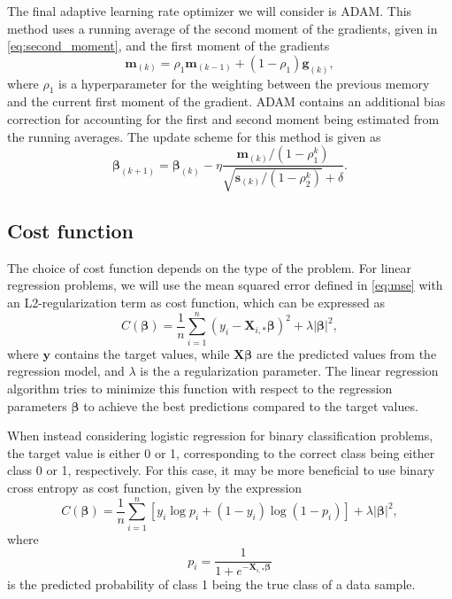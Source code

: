 \documentclass[12pt]{article}
\begin{document}
The final adaptive learning rate optimizer we will consider is ADAM. This method uses a running average of the second moment of the gradients, given in \autoref{eq:second_moment}, and the first moment of the gradients
\begin{equation}
    \boldsymbol{m}_{(k)} =  \rho_1 \boldsymbol{m}_{(k-1)} + (1 - \rho_1) \boldsymbol{g}_{(k)},
\end{equation}
where $\rho_1$ is a hyperparameter for the weighting between the previous memory and the current first moment of the gradient.
ADAM contains an additional bias correction for accounting for the first and second moment being estimated from the running averages. The update scheme for this method is given as
\begin{equation}
    \boldsymbol{\beta}_{(k+1)} = \boldsymbol{\beta}_{(k)} - \eta \frac{\boldsymbol{m}_{(k)} / (1 - \rho_1^k)}{\sqrt{\boldsymbol{s}_{(k)} / (1 - \rho_2^k)} + \delta}.
\end{equation}

\subsection{Cost function}
The choice of cost function depends on the type of the problem. For linear regression problems, we will use the mean squared error defined in \autoref{eq:mse} with an L2-regularization term as cost function, which can be expressed as 
\begin{equation}\label{eq:mse}
    C(\boldsymbol{\beta}) = \frac{1}{n} \sum_{i=1}^n (y_i - \boldsymbol{X}_{i,*} \boldsymbol{\beta})^2 + \lambda |\boldsymbol{\beta}|^2, 
\end{equation}
where $\boldsymbol{y}$ contains the target values, while $\boldsymbol{X} \boldsymbol{\beta}$ are the predicted values from the regression model, and $\lambda$ is the a regularization parameter. The linear regression algorithm tries to minimize this function with respect to the regression parameters $\boldsymbol{\beta}$ to achieve the best predictions compared to the target values.

When instead considering logistic regression for binary  classification problems, the target value is either \num{0} or \num{1}, corresponding to the correct class being either class 0 or 1, respectively. For this case, it may be more beneficial to use binary cross entropy as cost function, given by the expression
\begin{equation}\label{eq:cross_entropy}
    C\left(\boldsymbol{\beta}\right) = \frac{1}{n} \sum_{i=1}^n \left[ y_i \log{p_i} + (1-y_i) \log(1 - p_i) \right] + \lambda |\boldsymbol{\beta}|^2,
\end{equation}
where 
\begin{equation}
    \displaystyle p_i = \frac{1}{1 + e^{-\boldsymbol{X}_{i,*} \boldsymbol{\beta}}}
\end{equation}
is the predicted probability of class 1 being the true class of a data sample.
\end{document}

